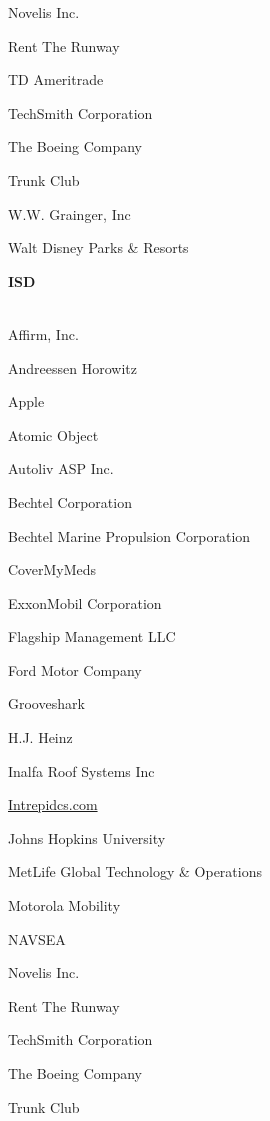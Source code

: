 \documentclass[twoside]{article}
\begin{document}
\begin{center}
\begin{multicols}{5}
\begin{FlushLeft}
\begin{compactitem}
\item Novelis Inc.
\item Rent The Runway
\item TD Ameritrade
\item TechSmith Corporation
\item The Boeing Company
\item Trunk Club
\item W.W. Grainger, Inc
\item Walt Disney Parks \& Resorts
\end{compactitem}
        \end{FlushLeft}
        \vspace{1em}
        {\fontsize{14}{16}\selectfont \bf ISD}\\
        \vspace{-1em}
        ~\hrulefill~
        \vspace{-.9em}
        \begin{FlushLeft}
        \begin{compactitem}
        \item Affirm, Inc.
\item Andreessen Horowitz
\item Apple
\item Atomic Object
\item Autoliv ASP Inc.
\item Bechtel Corporation
\item Bechtel Marine Propulsion Corporation
\item CoverMyMeds
\item ExxonMobil Corporation
\item Flagship Management LLC
\item Ford Motor Company
\item Grooveshark
\item H.J. Heinz
\item Inalfa Roof Systems Inc
\item \url{Intrepidcs.com}
\item Johns Hopkins University
\item MetLife Global Technology \& Operations
\item Motorola Mobility
\item NAVSEA
\item Novelis Inc.
\item Rent The Runway
\item TechSmith Corporation
\item The Boeing Company
\item Trunk Club

\end{compactitem}
\end{FlushLeft}
\end{multicols}
\end{center}
\end{document}
